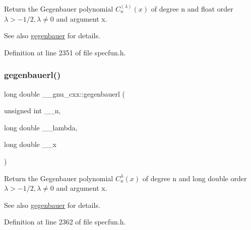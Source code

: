 Return the Gegenbauer polynomial $ C_n^{(\lambda)}(x) $ of degree {\ttfamily n} and {\ttfamily float} order $ \lambda > -1/2, \lambda \neq 0 $ and argument {\ttfamily x}.

\begin{DoxySeeAlso}{See also}
\hyperlink{group__mathsf__gnu_ga512e7981e328d6184f604de1892048b6}{gegenbauer} for details. 
\end{DoxySeeAlso}


Definition at line 2351 of file specfun.\+h.

\mbox{\label{group__mathsf__gnu_ga1f1110d7a116bd5636924bb96d24ecc3}} 
\subsubsection{\texorpdfstring{gegenbauerl()}{gegenbauerl()}}
{\footnotesize\ttfamily long double \+\_\+\+\_\+gnu\+\_\+cxx\+::gegenbauerl (\begin{DoxyParamCaption}\item[{unsigned int}]{\+\_\+\+\_\+n,  }\item[{long double}]{\+\_\+\+\_\+lambda,  }\item[{long double}]{\+\_\+\+\_\+x }\end{DoxyParamCaption})\hspace{0.3cm}{\ttfamily [inline]}}

Return the Gegenbauer polynomial $ C_n^{\lambda}(x) $ of degree {\ttfamily n} and {\ttfamily long double} order $ \lambda > -1/2, \lambda \neq 0 $ and argument {\ttfamily x}.

\begin{DoxySeeAlso}{See also}
\hyperlink{group__mathsf__gnu_ga512e7981e328d6184f604de1892048b6}{gegenbauer} for details. 
\end{DoxySeeAlso}


Definition at line 2362 of file specfun.\+h.

\mbox{\label{group__mathsf__gnu_gab052b72af9c7ec030bcea81965390614}} 
